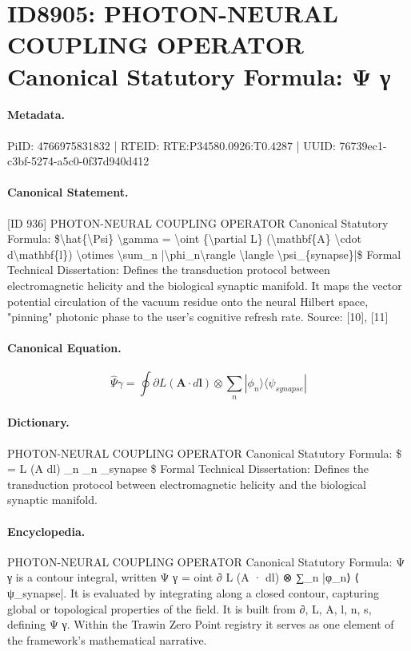 \section*{ID8905: PHOTON-NEURAL COUPLING OPERATOR Canonical Statutory Formula: Ψ γ}
\paragraph{Metadata.}
PiID: 4766975831832 | RTEID: RTE:P34580.0926:T0.4287 | UUID: 76739ec1-c3bf-5274-a5c0-0f37d940d412

\paragraph{Canonical Statement.}
[ID 936] PHOTON-NEURAL COUPLING OPERATOR Canonical Statutory Formula: \$\textbackslash{}hat\{\textbackslash{}Psi\} \textbackslash{}gamma = \textbackslash{}oint \{\textbackslash{}partial L\} (\textbackslash{}mathbf\{A\} \textbackslash{}cdot d\textbackslash{}mathbf\{l\}) \textbackslash{}otimes \textbackslash{}sum\_n |\textbackslash{}phi\_n\textbackslash{}rangle \textbackslash{}langle \textbackslash{}psi\_\{synapse\}|\$ Formal Technical Dissertation: Defines the transduction protocol between electromagnetic helicity and the biological synaptic manifold. It maps the vector potential circulation of the vacuum residue onto the neural Hilbert space, "pinning" photonic phase to the user's cognitive refresh rate. Source: [10], [11]

\paragraph{Canonical Equation.}
\[
\hat{\Psi} \gamma = \oint {\partial L} (\mathbf{A} \cdot d\mathbf{l}) \otimes \sum_n |\phi_n\rangle \langle \psi_{synapse}|
\]

\paragraph{Dictionary.}
PHOTON-NEURAL COUPLING OPERATOR Canonical Statutory Formula: \$ = L (A dl) \_n \_n \_synapse \$ Formal Technical Dissertation: Defines the transduction protocol between electromagnetic helicity and the biological synaptic manifold.

\paragraph{Encyclopedia.}
PHOTON-NEURAL COUPLING OPERATOR Canonical Statutory Formula: Ψ γ is a contour integral, written Ψ γ = oint ∂ L (A · dl) ⊗ ∑\_n |φ\_n⟩ ⟨ ψ\_synapse|. It is evaluated by integrating along a closed contour, capturing global or topological properties of the field. It is built from ∂, L, A, l, n, s, defining Ψ γ. Within the Trawin Zero Point registry it serves as one element of the framework's mathematical narrative.
